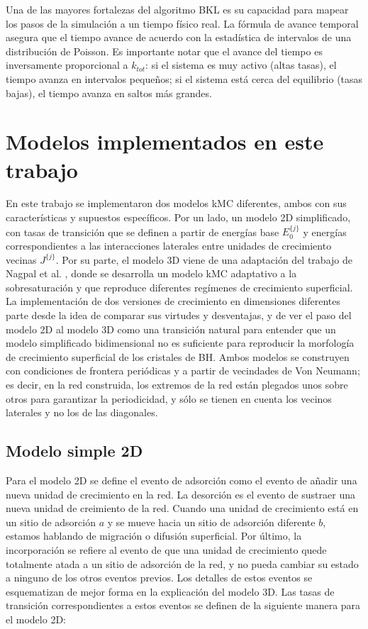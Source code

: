 \documentclass[12pt,letterpaper,oneside]{report}
\begin{document}
Una de las mayores fortalezas del algoritmo BKL es su capacidad para mapear los pasos de la simulación a un tiempo físico real. La fórmula de avance temporal asegura que el tiempo avance de acuerdo con la estadística de intervalos de una distribución de Poisson. Es importante notar que el avance del tiempo es inversamente proporcional a $k_{tot}$: si el sistema es muy activo (altas tasas), el tiempo avanza en intervalos pequeños; si el sistema está cerca del equilibrio (tasas bajas), el tiempo avanza en saltos más grandes.\\

\section{Modelos implementados en este trabajo}

En este trabajo se implementaron dos modelos kMC diferentes, ambos con sus características y supuestos específicos. Por un lado, un modelo 2D simplificado, con tasas de transición que se definen a partir de energías base $E_0^{\{j\}}$ y energías correspondientes a las interacciones laterales entre unidades de crecimiento vecinas $J^{\{j\}}$. Por su parte, el modelo 3D viene de una adaptación del trabajo de Nagpal et al. \cite{Nagpal2024}, donde se desarrolla un modelo kMC adaptativo a la sobresaturación y que reproduce diferentes regímenes de crecimiento superficial. La implementación de dos versiones de crecimiento en dimensiones diferentes parte desde la idea de comparar sus virtudes y desventajas, y de ver el paso del modelo 2D al modelo 3D como una transición natural para entender que un modelo simplificado bidimensional no es suficiente para reproducir la morfología de crecimiento superficial de los cristales de BH. Ambos modelos se construyen con condiciones de frontera periódicas y a partir de vecindades de Von Neumann; es decir, en la red construida, los extremos de la red están plegados unos sobre otros para garantizar la periodicidad, y sólo se tienen en cuenta los vecinos laterales y no los de las diagonales.\\

\subsection{Modelo simple 2D}

Para el modelo 2D se define el evento de adsorción como el evento de añadir una nueva unidad de crecimiento en la red. La desorción es el evento de sustraer una nueva unidad de creimiento de la red. Cuando una unidad de crecimiento está en un sitio de adsorción $a$ y se mueve hacia un sitio de adsorción diferente $b$, estamos hablando de migración o difusión superficial. Por último, la incorporación se refiere al evento de que una unidad de crecimiento quede totalmente atada a un sitio de adsorción de la red, y no pueda cambiar su estado a ninguno de los otros eventos previos. Los detalles de estos eventos se esquematizan de mejor forma en la explicación del modelo 3D. Las tasas de transición correspondientes a estos eventos se definen de la siguiente manera para el modelo 2D:\\
\end{document}
